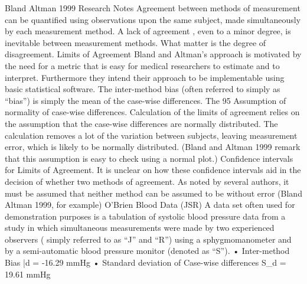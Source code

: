 Bland Altman 1999 Research Notes
Agreement between methods of measurement can be quantified using observations upon the same subject, made simultaneously  by each measurement method.
A lack of agreement , even to a minor degree, is inevitable between measurement methods. What matter is the degree of disagreement.
Limits of Agreement
Bland and Altman’s approach is motivated by the need for a metric that is easy for medical researchers to estimate and to interpret. Furthermore they intend their approach to be implementable using basic statistical software.
The inter-method bias (often referred to simply as “bias”) is simply the mean of the case-wise differences.
The 95%
Assumption of normality of case-wise differences.
Calculation of the limits of agreement relies on the assumption that the case-wise differences are normally distributed.
The calculation removes a lot of the variation between subjects,  leaving measurement error, which is likely to be normally distributed. (Bland and Altman 1999 remark that this assumption is easy to check using a normal plot.)
Confidence intervals for Limits of Agreement.
 It is unclear on how these confidence intervals aid in the decision of whether two methods of agreement.
As noted by several authors, it must be assumed that neither method can be assumed to be without error (Bland Altman 1999, for example)
O’Brien Blood Data (JSR)
A data set often used for demonstration purposes  is  a tabulation of systolic  blood pressure data from a study in which simultaneous measurements were made by two experienced observers ( simply referred to as “J” and “R”) using a sphygmomanometer and by a semi-automatic blood pressure monitor (denoted as “S”).
•	Inter-method Bias \bar{d} = -16.29 mmHg
•	Standard deviation of Case-wise differences  S_d = 19.61 mmHg

